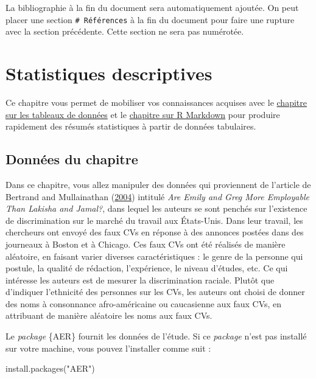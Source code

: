 \documentclass[
  11pt,
]{book}
\newenvironment{Shaded}{\begin{snugshade}}{\end{snugshade}}
\newcommand{\FunctionTok}[1]{\textcolor[rgb]{0.00,0.00,0.00}{#1}}
\newcommand{\NormalTok}[1]{#1}
\newcommand{\StringTok}[1]{\textcolor[rgb]{0.31,0.60,0.02}{#1}}
\numberwithin{equation}{section}
\numberwithin{countremarque}{section}
\begin{document}
La bibliographie à la fin du document sera automatiquement ajoutée. On peut placer une section \texttt{\#\ Références} à la fin du document pour faire une rupture avec la section précédente. Cette section ne sera pas numérotée.

\hypertarget{statistiques-descriptives}{%
\chapter{Statistiques descriptives}\label{statistiques-descriptives}}

Ce chapitre vous permet de mobiliser vos connaissances acquises avec le \protect\hyperlink{tableaux-de-donnuxe9es}{chapitre sur les tableaux de données} et le \protect\hyperlink{markdown}{chapitre sur R Markdown} pour produire rapidement des résumés statistiques à partir de données tabulaires.

\hypertarget{donnuxe9es-du-chapitre}{%
\section{Données du chapitre}\label{donnuxe9es-du-chapitre}}

Dans ce chapitre, vous allez manipuler des données qui proviennent de l'article de Bertrand and Mullainathan (\protect\hyperlink{ref-bertrand_2004_AER}{2004}) intitulé \emph{Are Emily and Greg More Employable Than Lakisha and Jamal?}, dans lequel les auteurs se sont penchés sur l'existence de discrimination sur le marché du travail aux États-Unis. Dans leur travail, les chercheurs ont envoyé des faux CVs en réponse à des annonces postées dans des journeaux à Boston et à Chicago. Ces faux CVs ont été réalisés de manière aléatoire, en faisant varier diverses caractéristiques : le genre de la personne qui postule, la qualité de rédaction, l'expérience, le niveau d'études, etc. Ce qui intéresse les auteurs est de mesurer la discrimination raciale. Plutôt que d'indiquer l'ethnicité des personnes sur les CVs, les auteurs ont choisi de donner des noms à consonnance afro-américaine ou caucasienne aux faux CVs, en attribuant de manière aléatoire les noms aux faux CVs.

Le \emph{package} \{AER\} fournit les données de l'étude. Si ce \emph{package} n'est pas installé sur votre machine, vous pouvez l'installer comme suit :

\begin{Shaded}
\begin{Highlighting}[]
\FunctionTok{install.packages}\NormalTok{(}\StringTok{"AER"}\NormalTok{)}
\end{Highlighting}
\end{Shaded}
\end{document}

